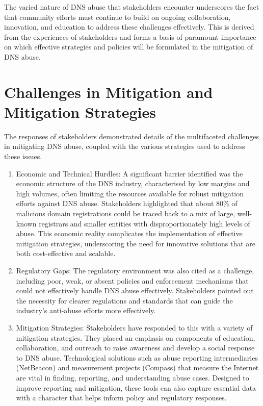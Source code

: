 The varied nature of DNS abuse that stakeholders encounter underscores the fact that community efforts must continue to build on ongoing collaboration, innovation, and education to address these challenges effectively. This is derived from the experiences of stakeholders and forms a basis of paramount importance on which effective strategies and policies will be formulated in the mitigation of DNS abuse.

\section{Challenges in Mitigation and Mitigation Strategies} 

The responses of stakeholders demonstrated details of the multifaceted challenges in mitigating DNS abuse, coupled with the various strategies used to address these issues.
\begin{enumerate}
    \item Economic and Technical Hurdles: A significant barrier identified was the economic structure of the DNS industry, characterised by low margins and high volumes, often limiting the resources available for robust mitigation efforts against DNS abuse. Stakeholders highlighted that about 80\% of malicious domain registrations could be traced back to a mix of large, well-known registrars and smaller entities with disproportionately high levels of abuse. This economic reality complicates the implementation of effective mitigation strategies, underscoring the need for innovative solutions that are both cost-effective and scalable.
    
    \item Regulatory Gaps: The regulatory environment was also cited as a challenge, including poor, weak, or absent policies and enforcement mechanisms that could not effectively handle DNS abuse effectively. Stakeholders pointed out the necessity for clearer regulations and standards that can guide the industry's anti-abuse efforts more effectively.
    \item Mitigation Strategies: Stakeholders have responded to this with a variety of mitigation strategies. They placed an emphasis on components of education, collaboration, and outreach to raise awareness and develop a social response to DNS abuse. Technological solutions such as abuse reporting intermediaries (NetBeacon) and measurement projects (Compass) that measure the Internet are vital in finding, reporting, and understanding abuse cases. Designed to improve reporting and mitigation, these tools can also capture essential data with a character that helps inform policy and regulatory responses.
    
    
\end{enumerate}


